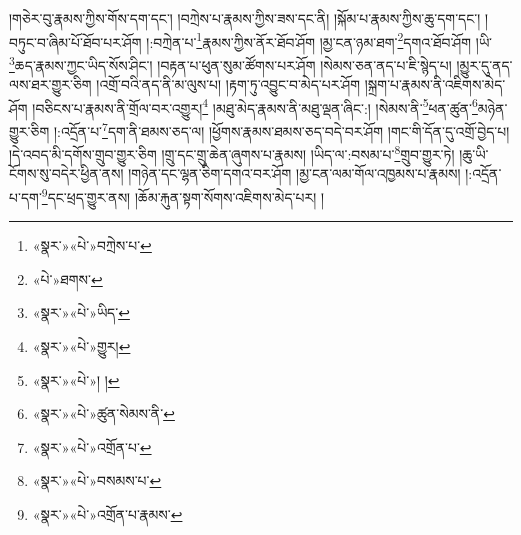 །གཅེར་བུ་རྣམས་ཀྱིས་གོས་དག་དང་། །བཀྲེས་པ་རྣམས་ཀྱིས་ཟས་དང་ནི། །སྐོམ་པ་རྣམས་ཀྱིས་ཆུ་དག་དང་། །བཏུང་བ་ཞིམ་པོ་ཐོབ་པར་ཤོག །:བཀྲེན་པ་\footnote{«སྣར་»«པེ་»བཀྲེས་པ་}རྣམས་ཀྱིས་ནོར་ཐོབ་ཤོག །མྱ་ངན་ཉམ་ཐག་\footnote{«པེ་»ཐགས་}དགའ་ཐོབ་ཤོག །ཡི་\footnote{«སྣར་»«པེ་»ཡིད་}ཆད་རྣམས་ཀྱང་ཡིད་སོས་ཤིང་། །བརྟན་པ་ཕུན་སུམ་ཚོགས་པར་ཤོག །སེམས་ཅན་ནད་པ་ཇི་སྙེད་པ། །མྱུར་དུ་ནད་ལས་ཐར་གྱུར་ཅིག །འགྲོ་བའི་ནད་ནི་མ་ལུས་པ། །རྟག་ཏུ་འབྱུང་བ་མེད་པར་ཤོག །སྐྲག་པ་རྣམས་ནི་འཇིགས་མེད་ཤོག །བཅིངས་པ་རྣམས་ནི་གྲོལ་བར་འགྱུར།\footnote{«སྣར་»«པེ་»གྱུར།} །མཐུ་མེད་རྣམས་ནི་མཐུ་ལྡན་ཞིང་:། །སེམས་ནི་\footnote{«སྣར་»«པེ་»། །}ཕན་ཚུན་\footnote{«སྣར་»«པེ་»ཚུན་སེམས་ནི་}མཉེན་གྱུར་ཅིག །:འདྲོན་པ་\footnote{«སྣར་»«པེ་»འགྲོན་པ་}དག་ནི་ཐམས་ཅད་ལ། །ཕྱོགས་རྣམས་ཐམས་ཅད་བདེ་བར་ཤོག །གང་གི་དོན་དུ་འགྲོ་བྱེད་པ། །དེ་འབད་མི་དགོས་གྲུབ་གྱུར་ཅིག །གྲུ་དང་གྲུ་ཆེན་ཞུགས་པ་རྣམས། །ཡིད་ལ་:བསམ་པ་\footnote{«སྣར་»«པེ་»བསམས་པ་}གྲུབ་གྱུར་ཏེ། །ཆུ་ཡི་ངོགས་སུ་བདེར་ཕྱིན་ནས། །གཉེན་དང་ལྷན་ཅིག་དགའ་བར་ཤོག །མྱ་ངན་ལམ་གོལ་འཁྱམས་པ་རྣམས། །:འདྲོན་པ་དག་\footnote{«སྣར་»«པེ་»འགྲོན་པ་རྣམས་}དང་ཕྲད་གྱུར་ནས། །ཆོམ་རྐུན་སྟག་སོགས་འཇིགས་མེད་པར། །
